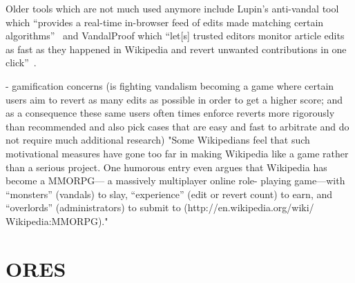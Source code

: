 
Older tools which are not much used anymore include Lupin's anti-vandal tool which
``provides a real-time in-browser feed of edits made matching certain algorithms''~\cite{GeiRib2010}
and VandalProof which
``let[s] trusted editors monitor article edits as fast as they happened in Wikipedia and revert unwanted contributions in one click''~\cite{HalRied2012}.


- gamification concerns (is fighting vandalism becoming a game where certain users aim to revert as many edits as possible in order to get a higher score; and as a consequence these same users often times enforce reverts more rigorously than recommended and also pick cases that are easy and fast to arbitrate and do not require much additional research)
    \cite{HalRied2012}
    "Some Wikipedians feel that such
    motivational measures have gone
    too far in making Wikipedia like a
    game rather than a serious project.
    One humorous entry even argues that
    Wikipedia has become a MMORPG—
    a massively multiplayer online role-
    playing game—with “monsters”
    (vandals) to slay, “experience”
    (edit or revert count) to earn, and
    “overlords” (administrators) to submit
    to (http://en.wikipedia.org/wiki/
    Wikipedia:MMORPG)."

\section{ORES}

